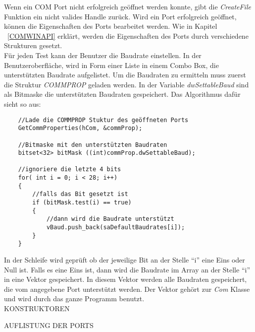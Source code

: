 Wenn ein COM Port nicht erfolgreich geöffnet werden konnte, gibt die \textit{CreateFile} Funktion ein nicht valides Handle zurück. Wird ein Port erfolgreich geöffnet, können die Eigenschaften des Ports bearbeitet werden. Wie in Kapitel ~\ref{COMWINAPI} erklärt, werden die Eigenschaften des Ports durch verschiedene Strukturen gesetzt.\\

Für jeden Test kann der Benutzer die Baudrate einstellen. In der Benutzeroberfläche, wird in Form einer Liste in einem Combo Box, die unterstützten Baudrate aufgelistet. Um die Baudraten zu ermitteln muss zuerst die Struktur \textit{COMMPROP} geladen werden. In der Variable \textit{dwSettableBaud} sind als Bitmaske die unterstützten Baudraten gespeichert. Das Algorithmus dafür sieht so aus:
\begin{lstlisting}
	//Lade die COMMPROP Stuktur des geöffneten Ports	 
	GetCommProperties(hCom, &commProp);
 
 	//Bitmaske mit den unterstützten Baudraten
	bitset<32> bitMask ((int)commProp.dwSettableBaud);
	
	//ignoriere die letzte 4 bits
	for( int i = 0; i < 28; i++)
	{
		//falls das Bit gesetzt ist
		if (bitMask.test(i) == true)
		{
			//dann wird die Baudrate unterstützt
			vBaud.push_back(saDefaultBaudrates[i]);
		}
	}
\end{lstlisting}

In der Schleife wird geprüft ob der jeweilige Bit an der Stelle "`i"' eine Eins oder Null ist. Falls es eine Eins ist, dann wird die Baudrate im Array an der Stelle "`i"' in eine Vektor gespeichert. In diesem Vektor werden alle Baudraten gespeichert, die vom angegebene Port unterstützt werden. Der Vektor gehört zur \textit{Com} Klasse und wird durch das ganze Programm benutzt.\\



 KONSTRUKTOREN
 
 AUFLISTUNG DER PORTS
\newpage


